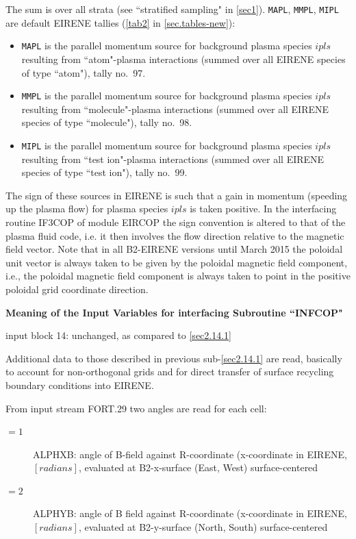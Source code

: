 The sum is over all strata (see  ``stratified sampling" in \cref{sec1}).
\lstinline|MAPL|, \lstinline|MMPL|,  \lstinline|MIPL| are
default EIRENE tallies (\cref{tab2} in \cref{sec.tables-new}):
\begin{itemize}
  \item \lstinline|MAPL| is the parallel momentum source for background
        plasma species $ipls$ resulting from ``atom"-plasma interactions (summed over
        all EIRENE species of type ``atom"), tally no.\ 97.
  \item \lstinline|MMPL| is the parallel momentum source for background
        plasma species $ipls$ resulting from ``molecule"-plasma interactions (summed
        over all EIRENE species of type ``molecule"), tally no.\ 98.
  \item \lstinline|MIPL| is the parallel momentum source for background
        plasma species $ipls$ resulting from ``test ion"-plasma interactions (summed
        over all EIRENE species of type ``test ion"), tally no.\ 99.
\end{itemize}
The sign of these sources in EIRENE is such that a gain in momentum (speeding
up the plasma flow) for plasma species $ipls$ is taken positive.
In the interfacing routine IF3COP of module EIRCOP the sign convention is
altered to that of the plasma fluid code, i.e. it then involves the flow
direction relative to the magnetic field vector.
Note that in all B2-EIRENE versions until March 2015 the poloidal unit vector
is always taken to be given by the poloidal magnetic field component, i.e., the
poloidal magnetic field component is always taken to point in the positive
poloidal grid coordinate direction.

\textbf{Meaning of the Input Variables for interfacing Subroutine ``INFCOP"}

\medskip 

input block 14: unchanged, as compared to \cref{sec2.14.1} 

\medskip 

Additional data to those described in previous sub-\cref{sec2.14.1} are read,
basically to account for non-orthogonal grids and for direct transfer of
surface recycling boundary conditions into EIRENE.

From input stream FORT.29 two angles are read for each cell:
\begin{description}
  \item[$= 1$] ALPHXB: angle of B-field against R-coordinate (x-coordinate in
        EIRENE, $[radians]$,  evaluated at B2-x-surface (East, West)  surface-centered
  \item[$= 2$] ALPHYB: angle of B field against R-coordinate (x-coordinate in
        EIRENE, $[radians]$,  evaluated at B2-y-surface (North, South) surface-centered
\end{description}

